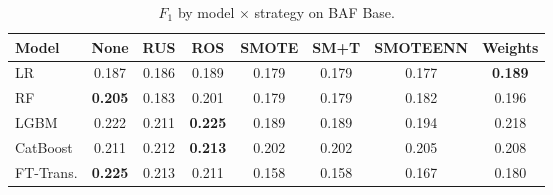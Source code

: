\begin{table}[ht!]
\centering
\caption{$F_1$ by model $\times$ strategy on BAF Base.}
\label{tab:factorial_baf_f1}
\begin{tabular}{l c c c c c c c}
\toprule
Model & None & RUS & ROS & SMOTE & SM+T & SMOTEENN & Weights \\
\midrule
LR         & 0.187 & 0.186 & 0.189 & 0.179 & 0.179 & 0.177 & \textbf{0.189} \\
RF         & \textbf{0.205} & 0.183 & 0.201 & 0.179 & 0.179 & 0.182 & 0.196 \\
LGBM       & 0.222 & 0.211 & \textbf{0.225} & 0.189 & 0.189 & 0.194 & 0.218 \\
CatBoost   & 0.211 & 0.212 & \textbf{0.213} & 0.202 & 0.202 & 0.205 & 0.208 \\
FT-Trans.  & \textbf{0.225} & 0.213 & 0.211 & 0.158 & 0.158 & 0.167 & 0.180 \\
\bottomrule
\end{tabular}
\end{table}